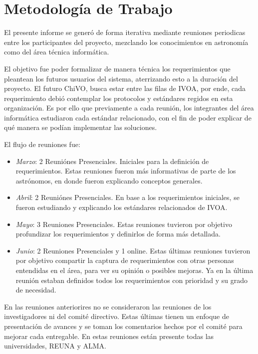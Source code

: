 \section{Metodología de Trabajo}

El presente informe se generó de forma iterativa mediante reuniones periodicas
entre los participantes del proyecto, mezclando los conocimientos en astronomía
como del área técnica informática.

El objetivo fue poder formalizar de manera técnica los requerimientos que
pleantean los futuros usuarios del sistema, aterrizando esto a la duración del
proyecto. El futuro ChiVO, busca estar entre las filas de IVOA, por ende, cada
requerimiento debió contemplar los protocolos y estándares regidos en esta
organización. Es por ello que previamente a cada reunión, los integrantes del
área informática estudiaron cada estándar relacionado, con el fin de poder
explicar de qué manera se podían implementar las soluciones.

El flujo de reuniones fue:
\begin{itemize}
	\item \emph{Marzo}: 2 Reuniónes Presenciales. Iniciales para la definición de
requerimientos. Estas reuniones fueron más informativas de parte de los
astrónomos, en donde fueron explicando conceptos generales.	
	\item \emph{Abril}: 2 Reuniónes Presenciales. En base a los requerimientos
iniciales, se fueron estudiando y explicando los estándares relacionados de
IVOA.
	\item \emph{Mayo}: 3 Reuniones Presenciales. Estas reuniones tuvieron por
objetivo profundizar los requerimientos y definirlos de forma más detallada.
	\item \emph{Junio}: 2 Reuniones Presenciales y 1 online. Estas últimas
reuniones tuvieron por objetivo compartir la captura de requerimientos con
otras personas entendidas en el área, para ver su opinión o posibles mejoras.
Ya en la última reunión estaban definidos todos los requerimientos con
prioridad y su grado de necesidad.
\end{itemize}

En las reuniones anteriorires no se consideraron las reuniones de los
investigadores ni del comité directivo. Estas últimas tienen un enfoque de
presentación de avances y se toman los comentarios hechos por el comité para
mejorar cada entregable. En estas reuniones están presente todas las
universidades, REUNA y ALMA.  
